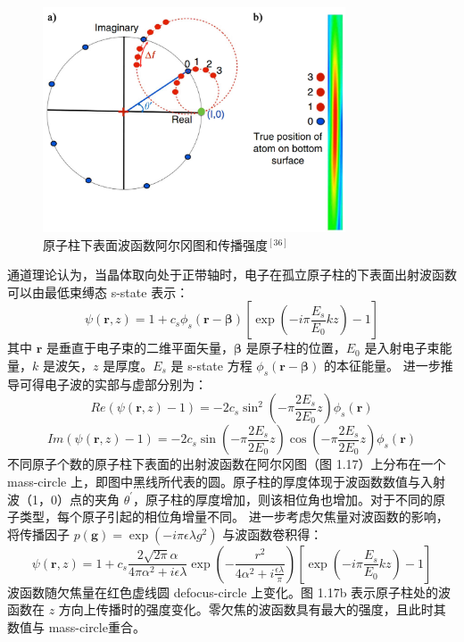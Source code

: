 \begin{figure}[htbp]
	\vspace{\baselineskip}
	\centering
	\includegraphics[width=0.8\textwidth]{../1.15/1_15}
	\caption{原子柱下表面波函数阿尔冈图和传播强度$^{[36]}$}\label{fig:115}
	\song{}
\end{figure}

通道理论认为，当晶体取向处于正带轴时，电子在孤立原子柱的下表面出射波函数可以由最低束缚态 s-state 表示：
\begin{equation}
\psi(\boldsymbol{r},z)=1+c_s\phi_s(\boldsymbol{r}-\boldsymbol{\beta})\left[\exp\left(-i\pi\frac{E_s}{E_0}kz\right)-1\right]
\end{equation}
其中 $\boldsymbol{r}$ 是垂直于电子束的二维平面矢量，$\boldsymbol{\beta}$ 是原子柱的位置，$E_0$ 是入射电子束能量，$k$ 是波矢，$z$ 是厚度。$E_s$ 是 s-state 方程 $\phi_s (\boldsymbol{r}-\boldsymbol{\beta})$ 的本征能量。
进一步推导可得电子波的实部与虚部分别为：
\begin{equation}
Re\left(\psi(\boldsymbol{r},z)-1\right)=-2c_s\sin^2\left(-\pi\frac{2E_s}{2E_0}z\right)\phi_s(\boldsymbol{r})
\end{equation}
\begin{equation}
Im\left(\psi(\boldsymbol{r},z)-1\right)=-2c_s\sin\left(-\pi\frac{2E_s}{2E_0}z\right)\cos\left(-\pi\frac{2E_s}{2E_0}z\right)\phi_s(\boldsymbol{r})
\end{equation}
不同原子个数的原子柱下表面的出射波函数在阿尔冈图（图 1.17）上分布在一个 mass-circle 上，即图中黑线所代表的圆。原子柱的厚度体现于波函数数值与入射波（1，0）点的夹角 $\theta^{\prime}$，原子柱的厚度增加，则该相位角也增加。对于不同的原子类型，每个原子引起的相位角增量不同。
进一步考虑欠焦量对波函数的影响，将传播因子 $p(\boldsymbol{g})=\exp(-i\pi \epsilon \lambda g^2 )$ 与波函数卷积得：
\begin{equation}
\psi(\boldsymbol{r},z)= 1+ c_s\frac{2\sqrt{2\pi} \alpha}{4\pi \alpha^2 + i\epsilon\lambda}\exp\left(-\frac{r^2}{4\alpha^2+i\frac{\epsilon\lambda}{\pi}}\right)\left[\exp\left(-i\pi\frac{E_s}{E_0}kz\right)-1\right]
\end{equation}
波函数随欠焦量在红色虚线圆 defocus-circle 上变化。图 1.17b 表示原子柱处的波函数在 $z$ 方向上传播时的强度变化。零欠焦的波函数具有最大的强度，且此时其数值与  mass-circle重合。

